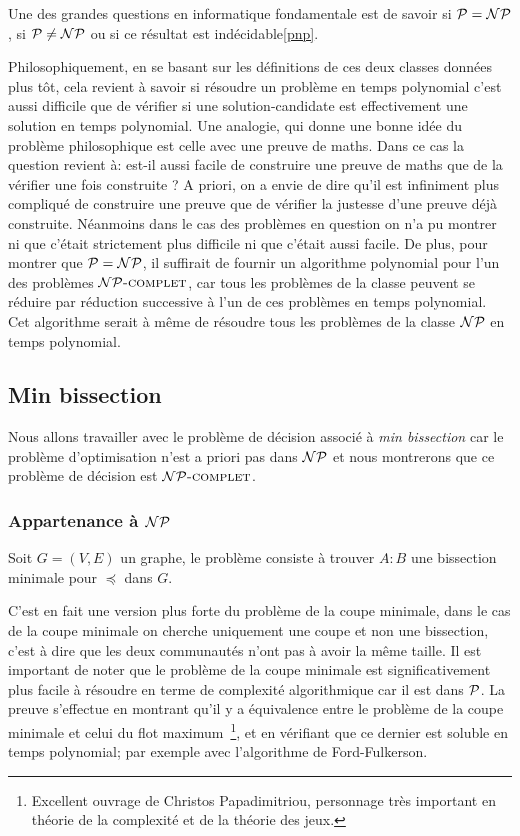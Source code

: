 \documentclass{standalone}
\begin{document}
Une des grandes questions en informatique fondamentale est de savoir si $\mathcal{P} = \mathcal{NP}$, si $\mathcal{P} \not= \mathcal{NP}$ ou si ce résultat est indécidable\ref{pnp}.

Philosophiquement, en se basant sur les définitions de ces deux classes données plus tôt, cela revient à savoir si résoudre un problème en temps polynomial c'est aussi difficile que de vérifier si une solution-candidate est effectivement une solution en temps polynomial. Une analogie, qui donne une bonne idée du problème philosophique est celle avec une preuve de maths. Dans ce cas la question revient à: est-il aussi facile de construire une preuve de maths que de la vérifier une fois construite ? A priori, on a envie de dire qu'il est infiniment plus compliqué de construire une preuve que de vérifier la justesse d'une preuve déjà construite. Néanmoins dans le cas des problèmes en question on n'a pu montrer ni que c'était strictement plus difficile ni que c'était aussi facile. De plus, pour montrer que $\mathcal{P} = \mathcal{NP}$, il suffirait de fournir un algorithme polynomial pour l'un des problèmes $\mathcal{NP}\text{\textsc{-complet}}$, car tous les problèmes de la classe peuvent se réduire par réduction successive à l'un de ces problèmes en temps polynomial. Cet algorithme serait à même de résoudre tous les problèmes de la classe $\mathcal{NP}$ en temps polynomial.
 
\subsection{Min bissection}

Nous allons travailler avec le problème de décision associé à \textit{min bissection} car le problème d'optimisation n'est a priori pas dans $\mathcal{NP}$ et nous montrerons que ce problème de décision est $\mathcal{NP}\text{\textsc{-complet}}$.

\subsubsection{Appartenance à $\mathcal{NP}$}

\begin{defn}
	Soit $G=(V, E)$ un graphe, le problème consiste à trouver $A:B$ une bissection minimale pour $\preceq$ dans $G$.
\end{defn}

\begin{rem}
	C'est en fait une version plus forte du problème de la coupe minimale, dans le cas de la coupe minimale on cherche uniquement une coupe et non une bissection, c'est à dire que les deux communautés n'ont pas à avoir la même taille. Il est important de noter que le problème de la coupe minimale est significativement plus facile à résoudre en terme de complexité algorithmique car il est dans $\mathcal{P}$. La preuve s'effectue en montrant qu'il y a équivalence entre le problème de la coupe minimale et celui du flot maximum~\cite{papadimitriou1982combinatorial}\footnote{Excellent ouvrage de Christos Papadimitriou, personnage très important en théorie de la complexité et de la théorie des jeux.}, et en vérifiant que ce dernier est soluble en temps polynomial; par exemple avec l'algorithme de Ford-Fulkerson.
\end{rem}
\end{document}
